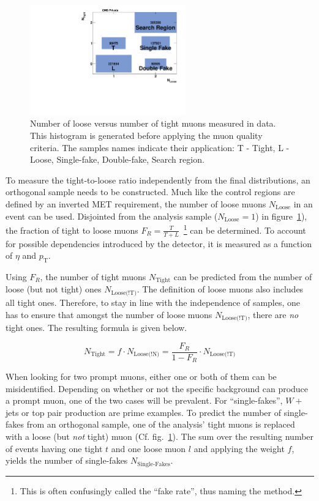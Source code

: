 \begin{figure}[ht!]
  \centering
    \includegraphics[width=0.6\textwidth]{plots/nloosetight.pdf}
  \caption{Number of loose versus number of tight muons measured in data. This histogram is generated before applying the muon quality criteria. The samples names indicate their application: T - Tight, L - Loose, Single-fake, Double-fake, Search region.}
  \label{fig:nloosetight}
\end{figure}

To measure the tight-to-loose ratio independently from the final distributions, an orthogonal sample needs to be constructed. Much like the control regions are defined by an inverted MET requirement, the number of loose muons $N_{\text{Loose}}$ in an event can be used. Disjointed from the analysis sample ($N_{\text{Loose}} = 1$) in figure~\ref{fig:nloosetight}), the fraction of tight to loose muons $F_R = \frac{T}{T+L}$~\footnote{This is often confusingly called the ``fake rate'', thus naming the method.} can be determined. To account for possible dependencies introduced by the detector, it is measured as a function of $\eta$ and $p_{\text{T}}$. 

Using $F_R$, the number of tight muons $N_{\text{Tight}}$ can be predicted from the number of loose (but not tight) ones $N_{\text{Loose(!T)}}$. The definition of loose muons also includes all tight ones. Therefore, to stay in line with the independence of samples, one has to ensure that amongst the number of loose muons $N_{\text{Loose(!T)}}$, there are \textit{no} tight ones. The resulting formula is given below.

\begin{equation}
  \label{eq:fakerate}
  N_{\text{Tight}} = f \cdot N_{\text{Loose(!N)}} = \frac{F_R }{1 - F_R} \cdot N_{\text{Loose(!T)}}
\end{equation}

When looking for two prompt muons, either one or both of them can be misidentified. Depending on whether or not the specific background can produce a prompt muon, one of the two cases will be prevalent. For ``single-fakes'', $W +$ jets or top pair production are prime examples. To predict the number of single-fakes from an orthogonal sample, one of the analysis' tight muons is replaced with a loose (but \textit{not} tight) muon (Cf. fig.~\ref{fig:nloosetight}). The sum over the resulting number of events having one tight $t$ and one loose muon $l$ and applying the weight $f$, yields the number of single-fakes $N_{\text{Single-Fakes}}$.

